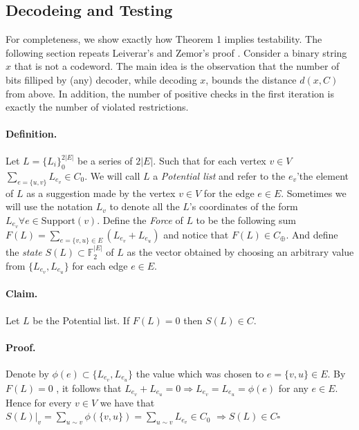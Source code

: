 \documentclass{article}
\begin{document}
\begin{multicols*}{2}
  \section{Decodeing and Testing}
  For completeness, we show exactly how Theorem 1 implies testability. The following section repeats Leiverar's and Zemor's proof \cite{leverrier2022quantum}. Consider a binary string $x$ that is not a codeword. The main idea is the observation that the number of bits filliped by (any) decoder, while decoding $x$, bounds the distance $d\left( x, C \right)$ from above. In addition, the number of positive checks in the first iteration is exactly the number of violated restrictions.
  \paragraph{Definition.}Let $L = \{L_{i}\}^{2|E|}_{0}$  be a series of $2|E|$. Such that for each vertex $ v \in V$ $\sum_{ e = \{u,v\} }{ L_{e_v} } \in C_{0}$. We will call $L$ a \textit{Potential list} and refer to the $e_{v}$'the element of $L$ as a suggestion made by the vertex $v \in V$ for the edge $e \in E$. Sometimes we will use the notation $L_{v}$ to denote all the $L$'s coordinates of the form $ L_{e_{v}} \forall e \in \text{Support} \left( v \right) $. Define the \textit{Force} of $L$ to be the following sum $  F\left( L \right) = \sum_{e = \{v,u\} \in E }{ \left(L_{e_v} + L_{e_u}\right) }$ and notice that $ F\left( L \right) \in C_{\oplus}$. And define the \textit{state} $S(L) \subset \mathbb{F}^{|E|}_{2}$ of $L$ as the vector obtained by choosing an arbitrary value from $ \{ L_{e_v}, L_{e_u} \}$ for each edge $e \in E$.  
  \paragraph{Claim.} Let $L$ be the Potential list. If $F(L)=0$ then $S(L)\in C$.
  \paragraph{Proof.} Denote by $\phi\left( e \right) \subset \{ L_{e_v}, L_{e_u} \}$ the value which was chosen to $e = \{v,u\} \in E$. By $F\left(L\right) = 0$ , it follows that $ L_{e_v} + L_{e_u} = 0 \Rightarrow L_{e_v} = L_{e_u} = \phi\left( e \right) $ for any $e \in E$. Hence for every $v\in V$ we have that $ S\left( L \right)|_{v} = \sum_{u \sim v}{ \phi\left( \{v,u\} \right) } =  \sum_{u \sim v}{ L_{e_v }} \in C_{0}$ $ \Rightarrow S\left( L \right) \in C \square$   


\end{multicols*}
\end{document}

